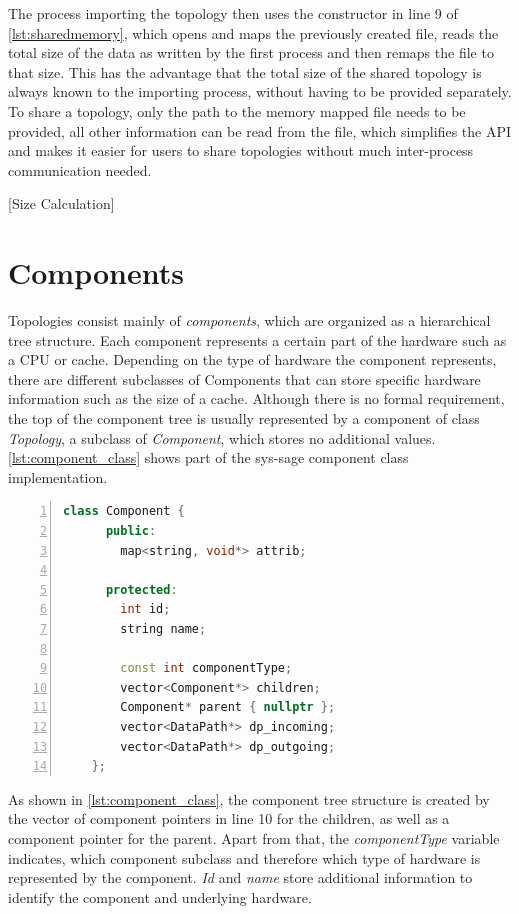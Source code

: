 The process importing the topology then uses the constructor in line 9 of \autoref{lst:sharedmemory}, which opens and maps the previously created file,
reads the total size of the data as written by the first process and then remaps the file to that size.
This has the advantage that the total size of the shared topology is always known to the importing process, without having to be provided separately.
To share a topology, only the path to the memory mapped file needs to be provided, all other information can be read from the file, which simplifies the API and makes it easier
for users to share topologies without much inter-process communication needed.


[Size Calculation]%

\section{Components}
Topologies consist mainly of \emph{components}, which are organized as a hierarchical tree structure.
Each component represents a certain part of the hardware such as a CPU or cache.
Depending on the type of hardware the component represents, there are different subclasses of Components that can store specific hardware information such as the size of a cache.
Although there is no formal requirement, the top of the component tree is usually represented by a component of class \emph{Topology}, a subclass of \emph{Component},
which stores no additional values.
\autoref{lst:component_class} shows part of the sys-sage component class implementation.

\begin{lstlisting}[language=c++, numbers=left, caption=Component Class, captionpos=b, label={lst:component_class}]
    class Component {
      public:
        map<string, void*> attrib;

      protected:
        int id;
        string name;

        const int componentType;
        vector<Component*> children;
        Component* parent { nullptr };
        vector<DataPath*> dp_incoming;
        vector<DataPath*> dp_outgoing;
    };
\end{lstlisting}

As shown in \autoref{lst:component_class}, the component tree structure is created by the vector of component pointers in line 10 for the children, as well as a component pointer
for the parent.
Apart from that, the \emph{componentType} variable indicates, which component subclass and therefore which type of hardware is represented by the component.
\emph{Id} and \emph{name} store additional information to identify the component and underlying hardware.

